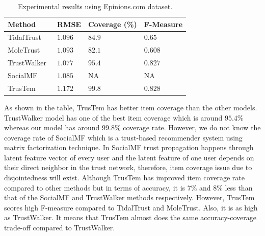 \documentclass[11pt, conference, onecolumn]{IEEEtran}
\begin{document}
\begin{table}
\centering

\begin{tabular}{|l|l|l|l|}
\hline
\textbf{Method}            & \textbf{RMSE}    & \textbf{Coverage (\%)} & \textbf{F-Measure} \\ \hline \hline
TidalTrust~\cite{Golbeck:2005}  & $1.096$ & $84.9$        & $0.65$    \\ \hline
MoleTrust~\cite{Massa:2007}   & $1.093$ & $82.1$        & $0.608$   \\ \hline
TrustWalker~\cite{Jamali:2009} & $1.077$ & $95.4$        & $0.827$   \\ \hline
SocialMF~\cite{Jamali:2010}    & $1.085$ & NA            & NA        \\ \hline
TrusTem     & $1.172$ & $99.8$        & $0.828$   \\ \hline
\end{tabular}
\caption{Experimental results using Epinions.com dataset.}
\label{tab:results}
\end{table}

As shown in the table, TrusTem has better item coverage than the other models. TrustWalker model has one of the best item coverage which is around $95.4\%$ whereas our model has around $99.8\%$ coverage rate. However, we do not know the coverage rate of SocialMF which is a trust-based recommender system using matrix factorization technique. In SocialMF trust propagation happens through latent feature vector of every user and the latent feature of one user depends on their direct neighbor in the trust network, therefore, item coverage issue due to disjointedness will exist. Although TrusTem has improved item coverage rate compared to other methods but in terms of accuracy, it is $7\%$ and $8\%$ less than that of the SocialMF and TrustWalker methods respectively. However, TrusTem scores high F-measure compared to TidalTrust and MoleTrust. Also, it is as high as TrustWalker. It means that TrusTem almost does the same accuracy-coverage trade-off compared to TrustWalker.
\end{document}
